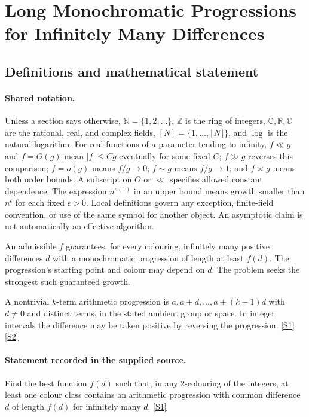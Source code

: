 \documentclass[11pt,a4paper]{article}
\newcommand{\N}{\mathbb{N}}
\newcommand{\Z}{\mathbb{Z}}
\newcommand{\Q}{\mathbb{Q}}
\newcommand{\R}{\mathbb{R}}
\newcommand{\C}{\mathbb{C}}
\newcommand{\sref}[2]{\hyperlink{source:#1:#2}{[S#2]}}
\begin{document}
\section{Long Monochromatic Progressions for Infinitely Many Differences}\label{statement}


\subsection{Definitions and mathematical statement}

\paragraph{Shared notation.}Unless a section says otherwise, $\N=\{1,2,\ldots\}$,
$\Z$ is the ring of integers, $\Q,\R,\C$ are the rational, real, and complex
fields, $[N]=\{1,\ldots,\lfloor N\rfloor\}$, and $\log$ is the natural
logarithm. For real functions of a parameter tending to infinity,
$f\ll g$ and $f=O(g)$ mean $|f|\leq Cg$ eventually for some fixed $C$;
$f\gg g$ reverses this comparison; $f=o(g)$ means $f/g\to0$;
$f\sim g$ means $f/g\to1$; and $f\asymp g$ means both order bounds.
A subscript on $O$ or $\ll$ specifies allowed constant dependence.
The expression $n^{o(1)}$ in an upper bound means growth smaller than
$n^\epsilon$ for each fixed $\epsilon>0$. Local definitions govern any
exception, finite-field convention, or use of the same symbol for another
object. An asymptotic claim is not automatically an effective algorithm.



An admissible $f$ guarantees, for every colouring, infinitely many positive differences $d$ with a monochromatic progression of length at least $f(d)$. The progression's starting point and colour may depend on $d$. The problem seeks the strongest such guaranteed growth.

A nontrivial $k$-term arithmetic progression is $a,a+d,\ldots,a+(k-1)d$ with $d\ne0$ and distinct terms, in the stated ambient group or space. In integer intervals the difference may be taken positive by reversing the progression. \sref{statement}{1} \sref{statement}{2}

\paragraph{Statement recorded in the supplied source.}
Find the best function $f(d)$ such that, in any 2-colouring of the integers, at least one colour class contains an arithmetic progression with common difference $d$ of length $f(d)$ for infinitely many $d$. \sref{statement}{1}
\end{document}
